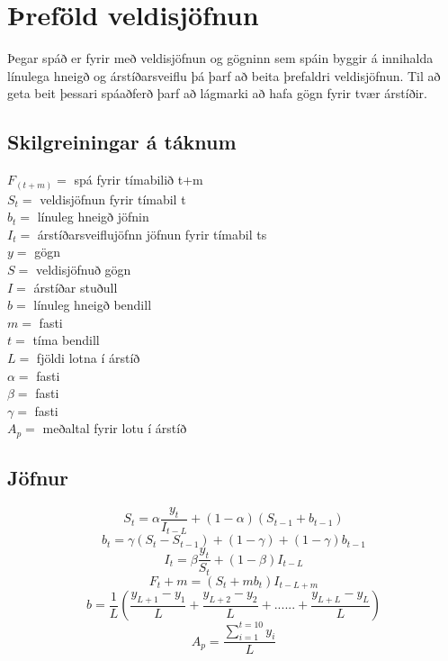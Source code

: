 \section {Þreföld veldisjöfnun}
 

Þegar spáð er fyrir með veldisjöfnun og gögninn sem spáin byggir á innihalda línulega hneigð og árstíðarsveiflu þá þarf að beita þrefaldri veldisjöfnun. Til að geta beit þessari spáaðferð þarf að lágmarki að hafa gögn fyrir tvær árstíðir.\cite{Holt-Winters}

\subsection{Skilgreiningar á táknum}
	$F_(t+m)=$ spá fyrir tímabilið  t+m \\
	$S_t =$  veldisjöfnun fyrir tímabil t\\ 	
	$b_t =$ línuleg hneigð jöfnin \\
	$I_t =$ árstíðarsveiflujöfnn jöfnun fyrir tímabil ts \\
	$y =$ gögn\\
	$S =$ veldisjöfnuð gögn \\
	$I =$	árstíðar stuðull \\
	$b =$ línuleg hneigð bendill \\
	$m =$ fasti	\\
	$t =$ tíma bendill \\
	$L =$ fjöldi lotna í árstíð \\
	$\alpha =$ fasti \\
	$\beta =$ fasti \\
	$\gamma =$ fasti \\
	$A_p =$ meðaltal fyrir lotu í árstíð\\


\subsection{Jöfnur}
	
	
	$$S_t = \alpha\dfrac{y_t}{I_{t - L}} + (1-\alpha)(S_{t-1}+ b_{t-1} ) $$
	$$b_t = \gamma  (S_{t}-S_{t-1})+(1- \gamma) + (1 - \gamma)b_{t-1}$$
	$$I_t = \beta \dfrac{y_t}{S_t} +(1-\beta)I_{t-L} $$
	$$F_t+m = (S_{t} +mb_{t})I_{t-L+m}$$
	$$b= \dfrac{1}{L}(\dfrac{y_{L+1}-y_1}{L} + \dfrac{y_{L+2}-y_2}{L}+......+ \dfrac{y_{L+L}-y_L}{L} ) $$
	$$A_p = \dfrac{\sum_{i=1}^{t=10} y_i}{L} $$